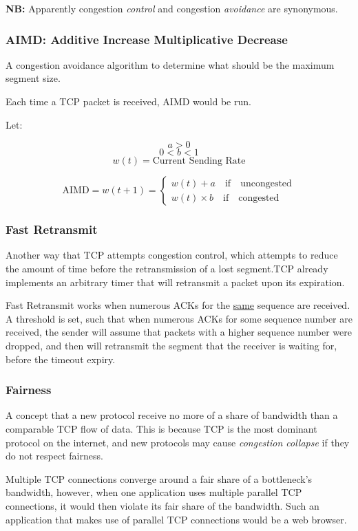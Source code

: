 \documentclass{article}
\begin{document}
\textbf{NB:} Apparently congestion \textit{control} and congestion \textit{avoidance} are synonymous.

\subsubsection{AIMD: Additive Increase Multiplicative Decrease}

A congestion avoidance algorithm to determine what should be the maximum segment size.

Each time a TCP packet is received, AIMD would be run.

Let:

\[a > 0\]
\[0 < b < 1\]
\[w(t) = \text{Current Sending Rate}\]


\[
\text{AIMD} = w(t + 1) = 
\begin{cases}
  w(t) + a \quad \text{if} \quad \text{uncongested}\\
  w(t) \times b \quad \text{if} \quad \text{congested}
\end{cases}
\]

\subsubsection{Fast Retransmit}

Another way that TCP attempts congestion control, which attempts to reduce the amount of time before the retransmission of a lost segment.TCP already implements an arbitrary timer that will retransmit a packet upon its expiration.

Fast Retransmit works when numerous ACKs for the \underline{same} sequence are received. A threshold is set, such that when numerous ACKs for some sequence number are received, the sender will assume that packets with a higher sequence number were dropped, and then will retransmit the segment that the receiver is waiting for, before the timeout expiry.

\subsubsection{Fairness}

A concept that a new protocol receive no more of a share of bandwidth than a comparable TCP flow of data. This is because TCP is the most dominant protocol on the internet, and new protocols may cause \textit{congestion collapse} if they do not respect fairness.

Multiple TCP connections converge around a fair share of a bottleneck's bandwidth, however, when one application uses multiple parallel TCP connections, it would then violate its fair share of the bandwidth. Such an application that makes use of parallel TCP connections would be a web browser.
\end{document}
